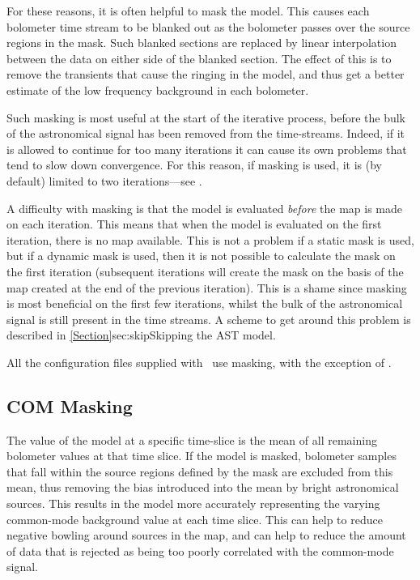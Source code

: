 For these reasons, it is often helpful to mask the  model.
This causes each bolometer time stream to be blanked out as the
bolometer passes over the source regions in the mask. Such blanked
sections are replaced by linear interpolation between the data on either
side of the blanked section. The effect of this is to remove the
transients that cause the ringing in the  model, and thus get
a better estimate of the low frequency background in each bolometer.

Such masking is most useful at the start of the iterative process,
before the bulk of the astronomical signal has been removed from the
time-streams. Indeed, if it is allowed to continue for too many iterations
it can cause its own problems that tend to slow down convergence. For
this reason, if  masking is used, it is (by default) limited
to two iterations---see .

A difficulty with  masking is that the  model is
evaluated \emph{before} the map is made on each iteration. This means
that when the  model is evaluated on the first iteration,
there is no map available. This is not a problem if a static mask is
used, but if a dynamic mask is used, then it is not possible to calculate
the  mask on the first iteration (subsequent iterations will
create the mask on the basis of the map created at the end of the
previous iteration). This is a shame since  masking is most
beneficial on the first few iterations, whilst the bulk of the astronomical
signal is still present in the time streams. A scheme to get around this
problem is described in \cref{Section}{sec:skip}{Skipping the AST model}.

All the configuration files supplied with \smurf\ use 
masking, with the exception of \blankfield.

\subsection{COM Masking}
\label{sec:commask}

The value of the  model at a specific time-slice is the mean
of all remaining bolometer values at that time slice. If the 
model is masked, bolometer samples that fall within the source regions
defined by the mask are excluded from this mean, thus removing the bias
introduced into the mean by bright astronomical sources. This results in
the  model more accurately representing the varying common-mode
background value at each time slice. This can help to reduce negative
bowling around sources in the map, and can help to reduce the amount of
data that is rejected as being too poorly correlated with the common-mode
signal.


